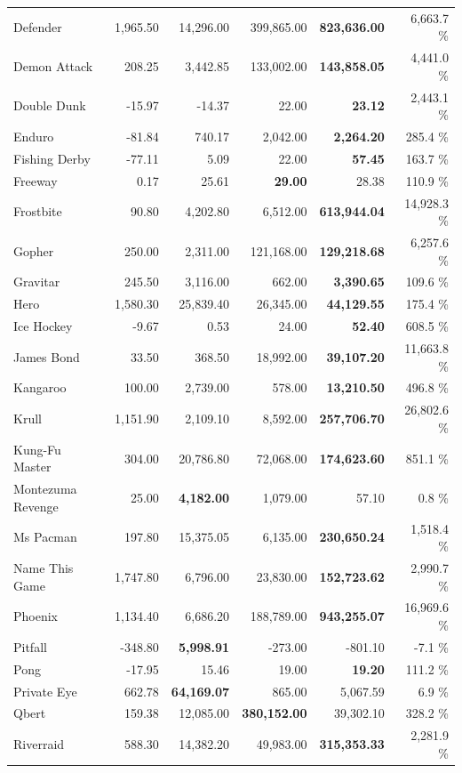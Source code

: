 \documentclass{article}
\begin{document}
\begin{table}
\begin{center}
\begin{tabularx}{0.750000\textwidth}{X| r r r r r}
Defender&1,965.50 & 14,296.00 & 399,865.00 & \textbf{823,636.00} & 6,663.7 \%\\
Demon Attack&208.25 & 3,442.85 & 133,002.00 & \textbf{143,858.05} & 4,441.0 \%\\
Double Dunk&-15.97 & -14.37 & 22.00 & \textbf{23.12} & 2,443.1 \%\\
Enduro&-81.84 & 740.17 & 2,042.00 & \textbf{2,264.20} & 285.4 \%\\
Fishing Derby&-77.11 & 5.09 & 22.00 & \textbf{57.45} & 163.7 \%\\
Freeway&0.17 & 25.61 & \textbf{29.00} & 28.38 & 110.9 \%\\
Frostbite&90.80 & 4,202.80 & 6,512.00 & \textbf{613,944.04} & 14,928.3 \%\\
Gopher&250.00 & 2,311.00 & 121,168.00 & \textbf{129,218.68} & 6,257.6 \%\\
Gravitar&245.50 & 3,116.00 & 662.00 & \textbf{3,390.65} & 109.6 \%\\
Hero&1,580.30 & 25,839.40 & 26,345.00 & \textbf{44,129.55} & 175.4 \%\\
Ice Hockey&-9.67 & 0.53 & 24.00 & \textbf{52.40} & 608.5 \%\\
James Bond&33.50 & 368.50 & 18,992.00 & \textbf{39,107.20} & 11,663.8 \%\\
Kangaroo&100.00 & 2,739.00 & 578.00 & \textbf{13,210.50} & 496.8 \%\\
Krull&1,151.90 & 2,109.10 & 8,592.00 & \textbf{257,706.70} & 26,802.6 \%\\
Kung-Fu Master&304.00 & 20,786.80 & 72,068.00 & \textbf{174,623.60} & 851.1 \%\\
Montezuma Revenge&25.00 & \textbf{4,182.00} & 1,079.00 & 57.10 & 0.8 \%\\
Ms Pacman&197.80 & 15,375.05 & 6,135.00 & \textbf{230,650.24} & 1,518.4 \%\\
Name This Game&1,747.80 & 6,796.00 & 23,830.00 & \textbf{152,723.62} & 2,990.7 \%\\
Phoenix&1,134.40 & 6,686.20 & 188,789.00 & \textbf{943,255.07} & 16,969.6 \%\\
Pitfall&-348.80 & \textbf{5,998.91} & -273.00 & -801.10 & -7.1 \%\\
Pong&-17.95 & 15.46 & 19.00 & \textbf{19.20} & 111.2 \%\\
Private Eye&662.78 & \textbf{64,169.07} & 865.00 & 5,067.59 & 6.9 \%\\
Qbert&159.38 & 12,085.00 & \textbf{380,152.00} & 39,302.10 & 328.2 \%\\
Riverraid&588.30 & 14,382.20 & 49,983.00 & \textbf{315,353.33} & 2,281.9 \%\\

\end{tabularx}
\end{center}
\end{table}
\end{document}
